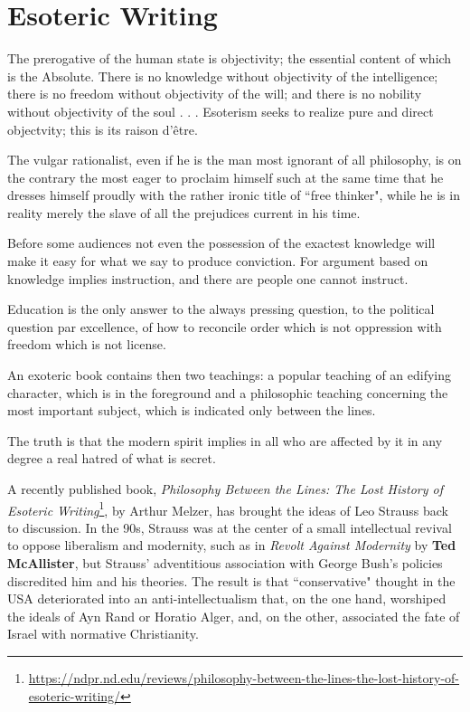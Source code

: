 \section{Esoteric Writing}

\begin{quotex}
The prerogative of the human state is objectivity; the essential content of which is the Absolute. There is no knowledge without objectivity of the intelligence; there is no freedom without objectivity of the will; and there is no nobility without objectivity of the soul . . . Esoterism seeks to realize pure and direct objectvity; this is its raison d'être. 

The vulgar rationalist, even if he is the man most ignorant of all philosophy, is on the contrary the most eager to proclaim himself such at the same time that he dresses himself proudly with the rather ironic title of ``free thinker", while he is in reality merely the slave of all the prejudices current in his time. 

Before some audiences not even the possession of the exactest knowledge will make it easy for what we say to produce conviction. For argument based on knowledge implies instruction, and there are people one cannot instruct. 

Education is the only answer to the always pressing question, to the political question par excellence, of how to reconcile order which is not oppression with freedom which is not license. 

An exoteric book contains then two teachings: a popular teaching of an edifying character, which is in the foreground and a philosophic teaching concerning the most important subject, which is indicated only between the lines. 

The truth is that the modern spirit implies in all who are affected by it in any degree a real hatred of what is secret. 

\end{quotex}
A recently published book, \emph{Philosophy Between the Lines: The Lost History of Esoteric Writing}\footnote{\url{https://ndpr.nd.edu/reviews/philosophy-between-the-lines-the-lost-history-of-esoteric-writing/}}, by Arthur Melzer, has brought the ideas of Leo Strauss back to discussion. In the 90s, Strauss was at the center of a small intellectual revival to oppose liberalism and modernity, such as in \emph{Revolt Against Modernity} by \textbf{Ted McAllister}, but Strauss' adventitious association with George Bush's policies discredited him and his theories. The result is that ``conservative" thought in the USA deteriorated into an anti-intellectualism that, on the one hand, worshiped the ideals of Ayn Rand or Horatio Alger, and, on the other, associated the fate of Israel with normative Christianity.

